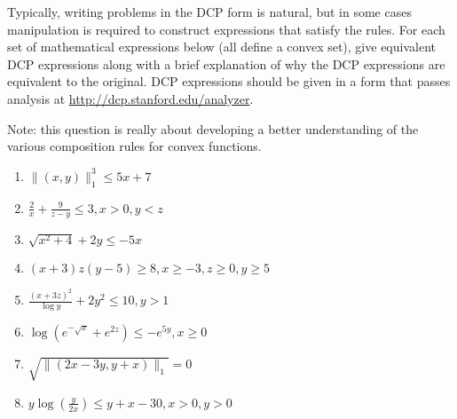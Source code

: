 \documentclass{article}
\theoremstyle{remark}
\theoremstyle{definition}
\begin{document}
Typically, writing problems in the DCP form is natural, but in some cases
manipulation is required to construct expressions that satisfy the
rules. For each set of mathematical expressions below (all define a convex set),
give equivalent DCP expressions along with a brief explanation of why the DCP
expressions are equivalent to the original. DCP expressions should be given in a
form that passes analysis at \url{http://dcp.stanford.edu/analyzer}.

Note: this question is really about developing a better understanding of
the various composition rules for convex functions.

\begin{enumerate}
\item $\|(x,y)\|_1^3 \le 5x + 7$
\item $\frac{2}{x} + \frac{9}{z-y} \leq 3, x > 0, y < z$
\item $\sqrt{x^2 + 4} + 2y \leq  - 5x$
\item $(x+3)z(y-5) \geq 8, x \geq -3, z \geq 0, y \geq 5$
\item $\frac{(x + 3z)^2}{\log y} + 2 y^2 \leq 10, y > 1$
\item $\log\left(e^{-\sqrt{x}} + e^{2z}\right) \leq -e^{5y}, x \geq 0$
\item $\sqrt{\|(2x - 3y, y + x)\|_1} = 0$
\item $y \log\left( \frac{y}{2x}\right) \leq y + x - 30, x > 0, y > 0$
\end{enumerate}
\end{document}
